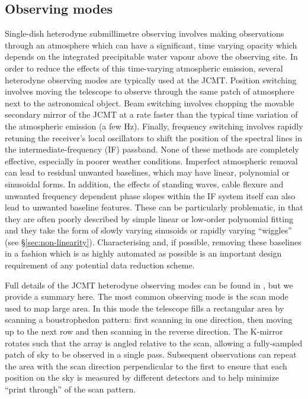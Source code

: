 \documentclass[a4paper,fleqn,usenatbib]{mnras}
\begin{document}
\subsection{Observing modes}
\label{sec:obsmodes}

Single-dish heterodyne submillimetre observing involves making
observations through an atmosphere which can have a significant, time
varying opacity which depends on the integrated precipitable water
vapour above the observing site. In order to reduce the effects of
this time-varying atmospheric emission, several heterodyne observing
modes are typically used at the JCMT. Position switching involves
moving the telescope to observe through the same patch of atmosphere
next to the astronomical object. Beam switching involves chopping the
movable secondary mirror of the JCMT at a rate faster than the
typical time variation of the atmospheric emission (a few
Hz). Finally, frequency switching involves rapidly retuning the
receiver's local oscillators to shift the position of the spectral
lines in the intermediate-frequency (IF) passband. None of these methods are completely
effective, especially in poorer weather conditions.  Imperfect
atmospheric removal can lead to residual unwanted baselines, which may
have linear, polynomial or sinusoidal forms. In addition, the effects
of standing waves, cable flexure and unwanted frequency dependent
phase slopes within the IF system itself can also lead to unwanted
baseline features. These can be particularly problematic, in that
they are often poorly described by simple linear or low-order polynomial
fitting and they take the form of slowly varying sinusoids or
rapidly varying ``wiggles'' (see \S\ref{sec:non-linearity}).
Characterising and, if possible, removing these baselines in a fashion
which is as highly automated as possible is an important design
requirement of any potential data reduction scheme.

Full details of the JCMT heterodyne observing modes can be found in
\citet{2009MNRAS.399.1026B}, but we provide a summary here. The most
common observing mode is the scan mode used to map large area. In this
mode the telescope fills a rectangular area by scanning a
boustrophedon pattern: first scanning in one direction, then moving up
to the next row and then scanning in the reverse direction. The
K-mirror rotates such that the array is angled relative to the scan,
allowing a fully-sampled patch of sky to be observed in a single
pass. Subsequent observations can repeat the area with the scan
direction perpendicular to the first to ensure that each position on
the sky is measured by different detectors and to help minimize
``print through'' of the scan pattern.
\end{document}
